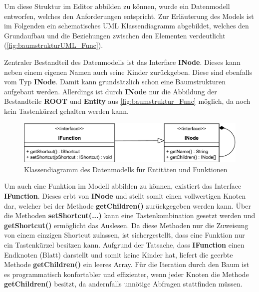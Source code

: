 Um diese Struktur im Editor abbilden zu können, wurde ein Datenmodell entworfen, welches den Anforderungen entspricht. Zur Erläuterung des Models ist im Folgenden ein schematisches UML Klassendiagramm abgebildet, welches den Grundaufbau und die Beziehungen zwischen den Elementen verdeutlicht (\autoref{fig:baumstrukturUML_Func}).

\vfill

Zentraler Bestandteil des Datenmodells ist das Interface \textbf{INode}. Dieses kann neben einem eigenen Namen auch seine Kinder zurückgeben. Diese sind ebenfalls vom Typ \textbf{INode}. Damit kann grundsätzlich schon eine Baumstrukturen aufgebaut werden. Allerdings ist durch \textbf{INode} nur die Abbildung der Bestandteile \textbf{ROOT} und \textbf{Entity} aus \autoref{fig:baumstruktur_Func} möglich, da noch kein Tastenkürzel gehalten werden kann.

\vfill

\begin{figure}[H]
	\vspace{20px}
	\centering
	\includegraphics[width=1\linewidth]{../graphic/diagrams/CD_Baumstruktur_Functions/Baumstruktur}
	\caption{Klassendiagramm des Datenmodells für Entitäten und Funktionen}
	\label{fig:baumstrukturUML_Func}
\end{figure}

\vfill

Um auch eine Funktion im Modell abbilden zu können, existiert das Interface \textbf{IFunction}. Dieses erbt von \textbf{INode} und stellt somit einen vollwertigen Knoten dar, welcher bei der Methode \textbf{getChildren()} zurückgegeben werden kann. Über die Methoden \textbf{setShortcut(...)} kann eine Tastenkombination gesetzt werden und \textbf{getShortcut()} ermöglicht das Auslesen. Da diese Methoden nur die Zuweisung von einem einzigen Shortcut zulassen, ist sichergestellt, dass eine Funktion nur ein Tastenkürzel besitzen kann. Aufgrund der Tatsache, dass \textbf{IFunction} einen Endknoten (Blatt) darstellt und somit keine Kinder hat, liefert die geerbte Methode \textbf{getChildren()} ein leeres Array. Für die Iteration durch den Baum ist es programmatisch konfortabler und effizienter, wenn jeder Knoten die Methode \textbf{getChildren()} besitzt, da andernfalls unnötige Abfragen stattfinden müssen.

